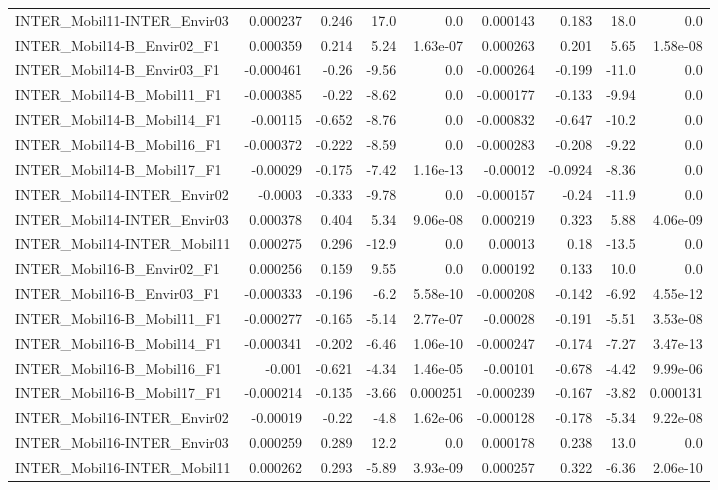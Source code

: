 \begin{tabular}{lrrrrrrrr}
INTER_Mobil11-INTER_Envir03 & 0.000237 & 0.246 & 17.0 & 0.0 & 0.000143 & 0.183 & 18.0 & 0.0 \\
INTER_Mobil14-B_Envir02_F1 & 0.000359 & 0.214 & 5.24 & 1.63e-07 & 0.000263 & 0.201 & 5.65 & 1.58e-08 \\
INTER_Mobil14-B_Envir03_F1 & -0.000461 & -0.26 & -9.56 & 0.0 & -0.000264 & -0.199 & -11.0 & 0.0 \\
INTER_Mobil14-B_Mobil11_F1 & -0.000385 & -0.22 & -8.62 & 0.0 & -0.000177 & -0.133 & -9.94 & 0.0 \\
INTER_Mobil14-B_Mobil14_F1 & -0.00115 & -0.652 & -8.76 & 0.0 & -0.000832 & -0.647 & -10.2 & 0.0 \\
INTER_Mobil14-B_Mobil16_F1 & -0.000372 & -0.222 & -8.59 & 0.0 & -0.000283 & -0.208 & -9.22 & 0.0 \\
INTER_Mobil14-B_Mobil17_F1 & -0.00029 & -0.175 & -7.42 & 1.16e-13 & -0.00012 & -0.0924 & -8.36 & 0.0 \\
INTER_Mobil14-INTER_Envir02 & -0.0003 & -0.333 & -9.78 & 0.0 & -0.000157 & -0.24 & -11.9 & 0.0 \\
INTER_Mobil14-INTER_Envir03 & 0.000378 & 0.404 & 5.34 & 9.06e-08 & 0.000219 & 0.323 & 5.88 & 4.06e-09 \\
INTER_Mobil14-INTER_Mobil11 & 0.000275 & 0.296 & -12.9 & 0.0 & 0.00013 & 0.18 & -13.5 & 0.0 \\
INTER_Mobil16-B_Envir02_F1 & 0.000256 & 0.159 & 9.55 & 0.0 & 0.000192 & 0.133 & 10.0 & 0.0 \\
INTER_Mobil16-B_Envir03_F1 & -0.000333 & -0.196 & -6.2 & 5.58e-10 & -0.000208 & -0.142 & -6.92 & 4.55e-12 \\
INTER_Mobil16-B_Mobil11_F1 & -0.000277 & -0.165 & -5.14 & 2.77e-07 & -0.00028 & -0.191 & -5.51 & 3.53e-08 \\
INTER_Mobil16-B_Mobil14_F1 & -0.000341 & -0.202 & -6.46 & 1.06e-10 & -0.000247 & -0.174 & -7.27 & 3.47e-13 \\
INTER_Mobil16-B_Mobil16_F1 & -0.001 & -0.621 & -4.34 & 1.46e-05 & -0.00101 & -0.678 & -4.42 & 9.99e-06 \\
INTER_Mobil16-B_Mobil17_F1 & -0.000214 & -0.135 & -3.66 & 0.000251 & -0.000239 & -0.167 & -3.82 & 0.000131 \\
INTER_Mobil16-INTER_Envir02 & -0.00019 & -0.22 & -4.8 & 1.62e-06 & -0.000128 & -0.178 & -5.34 & 9.22e-08 \\
INTER_Mobil16-INTER_Envir03 & 0.000259 & 0.289 & 12.2 & 0.0 & 0.000178 & 0.238 & 13.0 & 0.0 \\
INTER_Mobil16-INTER_Mobil11 & 0.000262 & 0.293 & -5.89 & 3.93e-09 & 0.000257 & 0.322 & -6.36 & 2.06e-10 \\

\end{tabular}
